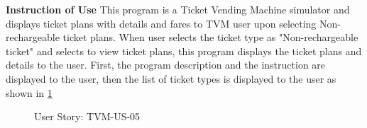 \documentclass[a4paper,12pt]{report}
\begin{document}
\begin{flushleft}
	\textbf{Instruction of Use}
	This program is a Ticket Vending Machine simulator and displays ticket plans with details and fares to TVM user upon selecting Non-rechargeable ticket plans.
	When user selects the ticket type as "Non-rechargeable ticket" and selects to view ticket plans, this program displays the ticket plans and details to the user.
	First, the program description and the instruction are displayed to the user, then the list of ticket types is displayed to the user as shown in \ref{fig:tvm05} \\
	
	
	\begin{figure}[!htb]
		\caption{\label{fig:tvm05}User Story: TVM-US-05}	
	\end{figure}
	

\end{flushleft}
\end{document}
